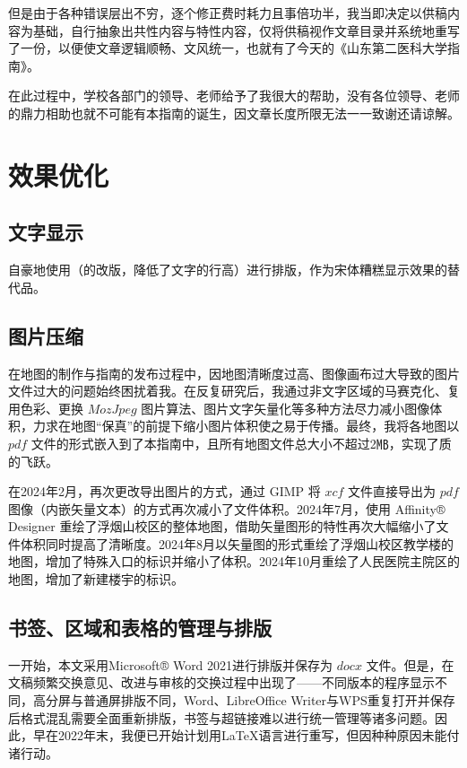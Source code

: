但是由于各种错误层出不穷，逐个修正费时耗力且事倍功半，我当即决定以供稿内容为基础，自行抽象出共性内容与特性内容，仅将供稿视作文章目录并系统地重写了一份，以便使文章逻辑顺畅、文风统一，也就有了今天的《山东第二医科大学指南》。

在此过程中，学校各部门的领导、老师给予了我很大的帮助，没有各位领导、老师的鼎力相助也就不可能有本指南的诞生，因文章长度所限无法一一致谢还请谅解。

\section[效果优化]{效果优化}
\subsection[文字显示]{文字显示}
自豪地使用（的改版，降低了文字的行高）进行排版，作为宋体糟糕显示效果的替代品。

\subsection[图片压缩]{图片压缩}
在地图的制作与指南的发布过程中，因地图清晰度过高、图像画布过大导致的图片文件过大\footnotemark 的问题始终困扰着我。在反复研究后，我通过非文字区域的马赛克化、复用色彩、更换 $MozJpeg$ 图片算法、图片文字矢量化等多种方法尽力减小图像体积，力求在地图“保真”的前提下缩小图片体积使之易于传播。最终，我将各地图以 $pdf$ 文件的形式嵌入到了本指南中，且所有地图文件总大小不超过2㎆，实现了质的飞跃。

在2024年2月，再次更改导出图片的方式，通过 GIMP 将 $xcf$ 文件直接导出为 $pdf$ 图像（内嵌矢量文本）的方式再次减小了文件体积。2024年7月，使用 Affinity® Designer 重绘了浮烟山校区的整体地图，借助矢量图形的特性再次大幅缩小了文件体积同时提高了清晰度。2024年8月以矢量图的形式重绘了浮烟山校区教学楼的地图，增加了特殊入口的标识并缩小了体积。2024年10月重绘了人民医院主院区的地图，增加了新建楼宇的标识。

\subsection[书签、区域和表格的管理与排版]{书签、区域和表格的管理与排版}
一开始，本文采用Microsoft® Word 2021进行排版并保存为 $docx$ 文件。但是，在文稿频繁交换意见、改进与审核的交换过程中出现了——不同版本的程序显示不同，高分屏与普通屏排版不同，Word、LibreOffice Writer与WPS重复打开并保存后格式混乱需要全面重新排版，书签与超链接难以进行统一管理等诸多问题。因此，早在2022年末，我便已开始计划用\LaTeX 语言进行重写，但因种种原因未能付诸行动。

